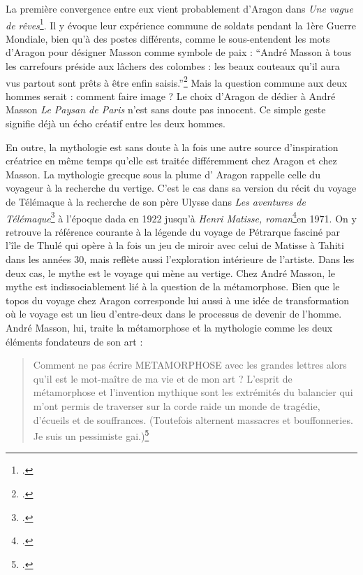 La première convergence entre eux vient probablement d’Aragon dans \emph{Une vague de rêves}\footcite{vaguedereves}. Il y évoque leur expérience commune de soldats pendant la 1ère Guerre Mondiale, bien qu’à des postes différents, comme le sous-entendent les mots d’Aragon pour désigner Masson comme symbole de paix : \enquote{André Masson à tous les carrefours préside aux lâchers des colombes : les beaux couteaux qu’il aura vus partout sont prêts à être enfin saisis.}\footcite[p28]{vaguedereves} Mais la question commune aux deux hommes serait : comment faire image ? Le choix d'Aragon de dédier à André Masson  \emph{Le Paysan de Paris } n'est sans doute pas innocent. Ce simple geste signifie déjà un écho créatif entre les deux hommes.

En outre, la mythologie est sans doute à la fois une autre source d’inspiration créatrice en même temps qu’elle est traitée différemment chez Aragon et chez Masson.  La mythologie grecque sous la plume d’ Aragon rappelle celle du voyageur à la recherche du vertige. C’est le cas dans sa version du récit du voyage de Télémaque à la recherche de son père Ulysse dans \emph{Les aventures de Télémaque}\footcite{telemaque} à l’époque dada en 1922 jusqu’à \emph{Henri Matisse, roman}\footcite{aragonmatisse}en 1971. On y retrouve la référence courante à la légende du voyage de Pétrarque fasciné par l’île de Thulé qui opère à la fois un jeu de miroir avec celui de Matisse à Tahiti dans les années 30, mais reflète aussi l’exploration intérieure de l’artiste. Dans les deux cas, le mythe est le voyage qui mène au vertige. Chez André Masson, le mythe est indissociablement lié à la question de la métamorphose. Bien que le topos du voyage chez Aragon corresponde lui aussi à une idée de transformation où le voyage est un lieu d’entre-deux dans le processus de devenir de l’homme. André Masson, lui, traite la métamorphose et la mythologie comme les deux éléments fondateurs de son art : 
\begin{quote}
Comment ne pas écrire METAMORPHOSE avec les grandes lettres alors qu’il est le mot-maître de ma vie et de mon art ? L’esprit de métamorphose et l’invention mythique sont les extrémités du balancier qui m’ont permis de traverser sur la corde raide un monde de tragédie, d’écueils et de souffrances. (Toutefois alternent massacres et bouffonneries. Je suis un pessimiste gai.)\footcite[p8]{memoiremonde}\end{quote}

